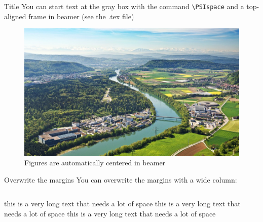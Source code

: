 \documentclass[aspectratio=43]{beamer}
\begin{document}
 \begin{frame}[t]{Title}
   \PSIvspace
  You can start text at the gray box with the command \texttt{\textbackslash PSIspace} and a top-aligned frame in beamer (see the .tex file)
  \begin{figure}
    \includegraphics[width=0.3\pagewidth]{PSIlandscape43}
    \caption{Figures are automatically centered in beamer}
    \label{fig:PSI}
  \end{figure}
\end{frame}

\begin{frame}{Overwrite the margins}
You can overwrite the margins with a wide column:
  \begin{columns}
  \begin{column}{1.18\linewidth}
    \colorbox{structure!10}{
      \begin{minipage}[t][0.8\textheight][t]{\textwidth}
        this is a very long text that needs a lot of space this is a very long text that needs a lot of space this is a very long text that needs a lot of space 
      \end{minipage}}
  \end{column}
\end{columns}
\end{frame}

  
\end{document}
